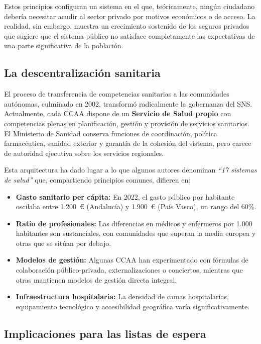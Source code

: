 Estos principios configuran un sistema en el que, teóricamente, ningún ciudadano
debería necesitar acudir al sector privado por motivos económicos o de acceso. La
realidad, sin embargo, muestra un crecimiento sostenido de los seguros privados
que sugiere que el sistema público no satisface completamente las expectativas de
una parte significativa de la población.

\subsection{La descentralización sanitaria}

El proceso de transferencia de competencias sanitarias a las comunidades autónomas,
culminado en 2002, transformó radicalmente la gobernanza del SNS. Actualmente, cada
CCAA dispone de un \textbf{Servicio de Salud propio} con competencias plenas en
planificación, gestión y provisión de servicios sanitarios. El Ministerio de
Sanidad conserva funciones de coordinación, política farmacéutica, sanidad exterior
y garantía de la cohesión del sistema, pero carece de autoridad ejecutiva sobre los
servicios regionales.

Esta arquitectura ha dado lugar a lo que algunos autores denominan \textit{``17
sistemas de salud''} que, compartiendo principios comunes, difieren en:

\begin{itemize}
  \item \textbf{Gasto sanitario per cápita:} En 2022, el gasto público por
    habitante oscilaba entre 1.200~€ (Andalucía) y 1.900~€ (País Vasco), un rango
    del 60\%.
  \item \textbf{Ratio de profesionales:} Las diferencias en médicos y enfermeros
    por 1.000 habitantes son sustanciales, con comunidades que superan la media
    europea y otras que se sitúan por debajo.
  \item \textbf{Modelos de gestión:} Algunas CCAA han experimentado con fórmulas
    de colaboración público-privada, externalizaciones o conciertos, mientras que
    otras mantienen modelos de gestión directa integral.
  \item \textbf{Infraestructura hospitalaria:} La densidad de camas hospitalarias,
    equipamiento tecnológico y accesibilidad geográfica varía significativamente.
\end{itemize}

\subsection{Implicaciones para las listas de espera}


